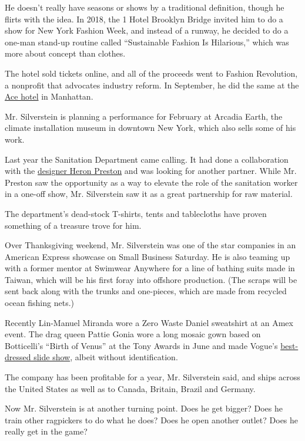 He doesn't really have seasons or shows by a traditional definition,
though he flirts with the idea. In 2018, the 1 Hotel Brooklyn Bridge
invited him to do a show for New York Fashion Week, and instead of a
runway, he decided to do a one-man stand-up routine called ``Sustainable
Fashion Is Hilarious,'' which was more about concept than clothes.

The hotel sold tickets online, and all of the proceeds went to Fashion
Revolution, a nonprofit that advocates industry reform. In September, he
did the same at the
\href{https://www.papermag.com/zero-waste-daniel-2640345826.html}{Ace
hotel} in Manhattan.

Mr. Silverstein is planning a performance for February at Arcadia Earth,
the climate installation museum in downtown New York, which also sells
some of his work.

Last year the Sanitation Department came calling. It had done a
collaboration with the
\href{https://www.nytimes.com/2016/09/10/fashion/new-york-fashion-week-heron-preston.html}{designer
Heron Preston} and was looking for another partner. While Mr. Preston
saw the opportunity as a way to elevate the role of the sanitation
worker in a one-off show, Mr. Silverstein saw it as a great partnership
for raw material.

The department's dead-stock T-shirts, tents and tablecloths have proven
something of a treasure trove for him.

Over Thanksgiving weekend, Mr. Silverstein was one of the star companies
in an American Express showcase on Small Business Saturday. He is also
teaming up with a former mentor at Swimwear Anywhere for a line of
bathing suits made in Taiwan, which will be his first foray into
offshore production. (The scraps will be sent back along with the trunks
and one-pieces, which are made from recycled ocean fishing nets.)

Recently Lin-Manuel Miranda wore a Zero Waste Daniel sweatshirt at an
Amex event. The drag queen Pattie Gonia wore a long mosaic gown based on
Botticelli's ``Birth of Venus'' at the Tony Awards in June and made
Vogue's
\href{https://www.vogue.com/slideshow/best-red-carpet-moments-fashion-tony-awards}{best-dressed
slide show}, albeit without identification.

The company has been profitable for a year, Mr. Silverstein said, and
ships across the United States as well as to Canada, Britain, Brazil and
Germany.

Now Mr. Silverstein is at another turning point. Does he get bigger?
Does he train other ragpickers to do what he does? Does he open another
outlet? Does he really get in the game?

